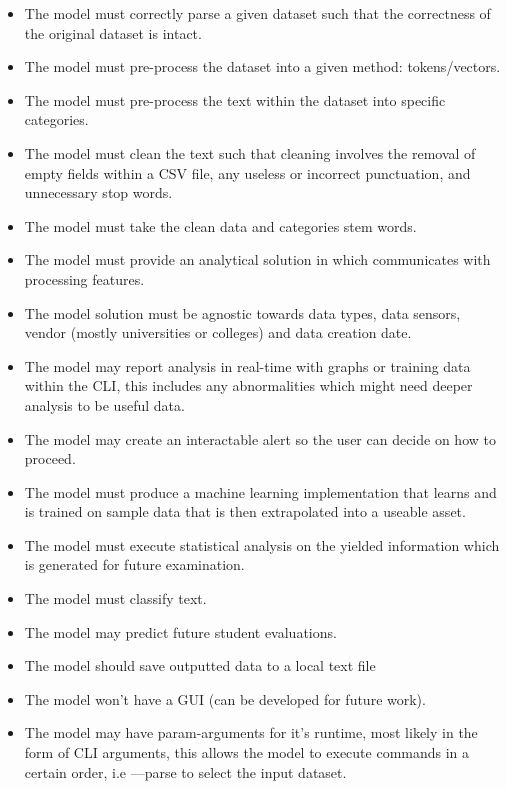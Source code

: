 \begin{itemize}
    \item The model must correctly parse a given dataset such that the correctness of the original dataset is intact.
    \item The model must pre-process the dataset into a given method: tokens/vectors.
    \item The model must pre-process the text within the dataset into specific categories.
    \item The model must clean the text such that cleaning involves the removal of empty fields within a CSV file, any useless or incorrect punctuation, and unnecessary stop words.
    \item The model must take the clean data and categories stem words.
    \item The model must provide an analytical solution in which communicates with processing features.
    \item The model solution must be agnostic towards data types, data sensors, vendor (mostly universities or colleges) and data creation date.
    \item The model may report analysis in real-time with graphs or training data within the CLI, this includes any abnormalities which might need deeper analysis to be useful data.
    \item The model may create an interactable alert so the user can decide on how to proceed.
    \item The model must produce a machine learning implementation that learns and is trained on sample data that is then extrapolated into a useable asset.
    \item The model must execute statistical analysis on the yielded information which is generated for future examination.
    \item The model must classify text.
    \item The model may predict future student evaluations.
    \item The model should save outputted data to a local text file
    \item The model won’t have a GUI (can be developed for future work).
    \item The model may have param-arguments for it's runtime, most likely in the form of CLI arguments, this allows the model to execute commands in a certain order, i.e \verb-----parse to select the input dataset.
\end{itemize}

